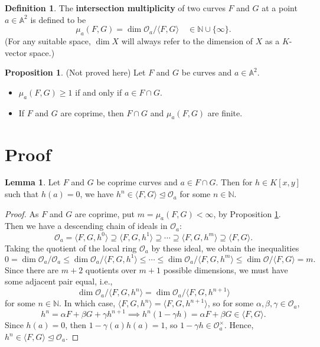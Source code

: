 \documentclass[12pt]{article}
\newenvironment{fullbox}{\begin{lrbox}{\savefullbox}\begin{minipage}{\dimexpr\textwidth-2\fboxsep\relax}}{\end{minipage}\end{lrbox}\begin{center}\framebox[\textwidth]{\usebox{\savefullbox}}\end{center}}
\theoremstyle{definition}
\newtheorem{lemma}[theorem]{Lemma}
\newtheorem{proposition}[theorem]{Proposition}
\newtheorem{definition}[theorem]{Definition}
\newenvironment{blemma}{\begin{fullbox}\begin{lemma}}{\end{lemma}\end{fullbox}}
\newenvironment{bproposition}{\begin{fullbox}\begin{proposition}}{\end{proposition}\end{fullbox}}
\newenvironment{bdefinition}{\begin{fullbox}\begin{definition}}{\end{definition}\end{fullbox}}
\newcommand{\N}{\mathbb{N}}
\newcommand{\<}{\langle}
\renewcommand{\>}{\rangle}
\newcommand{\A}{\mathbb{A}}
\renewcommand{\O}{\mathscr{O}}
\newcommand{\teq}{\trianglelefteq}
\begin{document}
\begin{bdefinition}
    The \textbf{intersection multiplicity} of two curves $F$ and $G$ at a point $a \in \A^2$ is defined to be
    \[
        \mu_a(F, G) = \dim \O_a / \<F, G\> 
        \quad \in \N \cup \{\infty\}.
    \]
    (For any suitable space, $\dim X$ will always refer to the dimension of $X$ as a $K$-vector space.)
\end{bdefinition}


\begin{bproposition}\label{unproved}(Not proved here)
    Let $F$ and $G$ be curves and $a \in \A^2$.
    \begin{itemize}
        \item $\mu_a(F, G) \geq 1$ if and only if $a \in F \cap G$.
        \item If $F$ and $G$ are coprime, then $F \cap G$ and $\mu_a(F, G)$ are finite. 
    \end{itemize}
\end{bproposition}

\section{Proof}

\begin{blemma}\label{power-in-ideal}
    Let $F$ and $G$ be coprime curves and $a \in F \cap G$. Then for $h \in K[x, y]$ such that $h(a) = 0$, we have $h^n \in \<F, G\> \teq \O_a$ for some $n \in \N$.
\end{blemma}

\begin{proof}
    As $F$ and $G$ are coprime, put $m = \mu_a(F, G) < \infty$, by Proposition \ref{unproved}. Then we have a descending chain of ideals in $\O_a$:
    \[
        \O_a = \<F, G, h^0\>
            \supseteq \<F, G, h^1\>
            \supseteq \cdots
            \supseteq \<F, G, h^m\>
            \supseteq \<F, G\>.
    \]
    Taking the quotient of the local ring $\O_a$ by these ideal, we obtain the inequalities
    \[
        0
            = \dim \O_a / \O_a
            \leq \dim \O_a / \<F, G, h^1\>
            \leq \cdots
            \leq \dim \O_a / \<F, G, h^m\>
            \leq \dim \O / \<F, G\>
            = m.
    \]
    Since there are $m + 2$ quotients over $m + 1$ possible dimensions, we must have some adjacent pair equal, i.e.,
    \[
        \dim \O_a / \<F, G, h^n\> = \dim \O_a / \<F, G, h^{n + 1}\>
    \]
    for some $n \in \N$. In which case, $\<F, G, h^n\> = \<F, G, h^{n + 1}\>$, so for some $\alpha, \beta, \gamma \in \O_a$,
    \[
        h^n = \alpha F + \beta G + \gamma h^{n+1}
        \implies
        h^n(1 - \gamma h) = \alpha F + \beta G \in \<F, G\>.
    \]
    Since $h(a) = 0$, then $1 - \gamma(a)h(a) = 1$, so $1 - \gamma h \in \O_a^\times$. Hence, $h^n \in \<F, G\> \teq \O_a$.

\end{proof}
\end{document}
